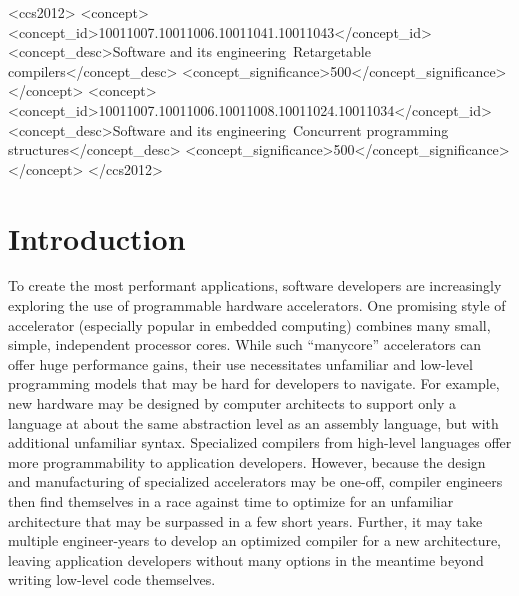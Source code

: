 \documentclass{sig-alternate-05-2015}
\begin{document}
%
%
\begin{CCSXML}
<ccs2012>
<concept>
<concept_id>10011007.10011006.10011041.10011043</concept_id>
<concept_desc>Software and its engineering~Retargetable compilers</concept_desc>
<concept_significance>500</concept_significance>
</concept>
<concept>
<concept_id>10011007.10011006.10011008.10011024.10011034</concept_id>
<concept_desc>Software and its engineering~Concurrent programming structures</concept_desc>
<concept_significance>500</concept_significance>
</concept>
</ccs2012>
\end{CCSXML}

%
%

%
%
\printccsdesc


\section{Introduction}
To create the most performant applications, software developers are increasingly exploring the use of programmable hardware accelerators. One promising style of accelerator (especially popular in embedded computing) combines many small, simple, independent processor cores. While such ``manycore'' accelerators can offer huge performance gains, their use necessitates unfamiliar and low-level programming models that may be hard for developers to navigate. For example, new hardware may be designed by computer architects to support only a language at about the same abstraction level as an assembly language, but with additional unfamiliar syntax. Specialized compilers from high-level languages offer more programmability to application developers. However, because the design and manufacturing of specialized accelerators may be one-off, compiler engineers then find themselves in a race against time to optimize for an unfamiliar architecture that may be surpassed in a few short years. Further, it may take multiple engineer-years to develop an optimized compiler for a new architecture, leaving application developers without many options in the meantime beyond writing low-level code themselves.
\end{document}
